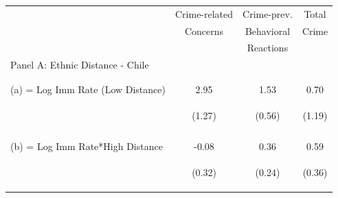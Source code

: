 \begin{center}
\begin{tabular}{lccc}
\hline \noalign{\smallskip} & Crime-related & Crime-prev. & Total\\
 & Concerns & Behavioral & Crime\\
 &  & Reactions & \\
\noalign{\smallskip}\hline \noalign{\smallskip}Panel A: Ethnic Distance - Chile &  &  & \\
 & \begin{footnotesize}\end{footnotesize} & \begin{footnotesize}\end{footnotesize} & \begin{footnotesize}\end{footnotesize}\\
 & \begin{footnotesize}\end{footnotesize} & \begin{footnotesize}\end{footnotesize} & \begin{footnotesize}\end{footnotesize}\\
\noalign{\smallskip}(a) = Log Imm Rate (Low Distance) & 2.95 & 1.53 & 0.70\\
 & \begin{footnotesize}(1.27)\end{footnotesize} & \begin{footnotesize}(0.56)\end{footnotesize} & \begin{footnotesize}(1.19)\end{footnotesize}\\
 & \begin{footnotesize}[0.023]\end{footnotesize} & \begin{footnotesize}[0.008]\end{footnotesize} & \begin{footnotesize}[0.558]\end{footnotesize}\\
\noalign{\smallskip}(b) = Log Imm Rate*High Distance & -0.08 & 0.36 & 0.59\\
 & \begin{footnotesize}(0.32)\end{footnotesize} & \begin{footnotesize}(0.24)\end{footnotesize} & \begin{footnotesize}(0.36)\end{footnotesize}\\

\end{tabular}
\end{center}
